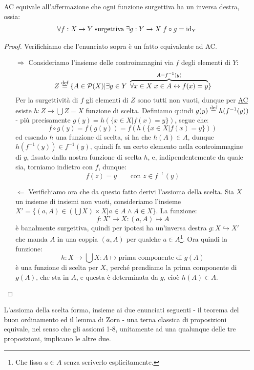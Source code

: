 \begin{note}
	AC equivale all'affermazione che ogni funzione surgettiva ha un inversa destra, ossia:
	\[ \forall f : X \rightarrow Y \; \text{surgettiva}\;\exists g : Y \rightarrow X \; f \circ g = \operatorname{id}_Y
		\]
\end{note}

\begin{proof}
	Verifichiamo che l'enunciato sopra è un fatto equivalente ad AC.
	\begin{itemize}
		\item[$\boxed{\Longrightarrow}$] Consideriamo l'insieme delle controimmagini via $f$ degli elementi di $Y$:
		\[ Z \overset{\text{def}}{=} \{A \in \mathcal{P}(X) | \exists y \in Y \; \overbrace{\forall x \in X \; x \in A \leftrightarrow f(x) = y}^{A = f^{-1}(y)}\}
			\]
		Per la surgettività di $f$ gli elementi di $Z$ sono tutti non vuoti, dunque per \hyperref[ax9]{AC} esiste $h : Z \rightarrow \bigcup Z = X$ funzione di scelta.
		Definiamo quindi $g(y) \overset{\text{def}}{=} h(f^{-1}(y))$ - più precisamente $g(y) = h(\{x \in X | f(x)  = y\})$, segue che:
		\[ f \circ g(y) = f(g(y)) = f(h(\{x \in X | f(x)  = y\}))
			\]
		ed essendo $h$ una funzione di scelta, si ha che $h(A) \in A$, dunque $h(f^{-1}(y)) \in f^{-1}(y)$, quindi fa un certo elemento nella controimmagine di $y$, fissato dalla nostra funzione di scelta $h$, e, indipendentemente da quale sia, torniamo indietro con $f$, dunque:
		\[ f(z) = y \qquad \text{con $z \in f^{-1}(y)$}
			\]
		\item[$\boxed{\Longleftarrow}$] Verifichiamo ora che da questo fatto derivi l'assioma della scelta. Sia $X$ un insieme di insiemi non vuoti, consideriamo l'insieme $X' = \{(a,A) \in \left(\bigcup X\right) \times X | a \in A \land A \in X\}$.
		La funzione:
		\[ f : X' \rightarrow X : (a,A) \mapsto A
			\]
		è banalmente surgettiva, quindi per ipotesi ha un'inversa destra $g : X \hookrightarrow X'$ che manda $A$ in una coppia $(a,A)$ per qualche $a \in A$\footnote{Che fissa $a \in A$ senza scriverlo esplicitamente.}.
		Ora quindi la funzione:
		\[ h : X \rightarrow \bigcup X : A \mapsto \text{prima componente di $g(A)$}
			\]
		è una funzione di scelta per $X$, perché prendiamo la prima componente di $g(A)$, che sta in $A$, e questa è determinata da $g$, cioè $h(A) \in A$.
	\end{itemize}
\end{proof}

L'assioma della scelta forma, insieme ai due enunciati seguenti - il teorema del buon ordinamento ed il lemma di Zorn - una terna classica di proposizioni equivale, nel senso che gli assiomi 1-8, unitamente ad una qualunque delle tre proposizioni, implicano le altre due.

